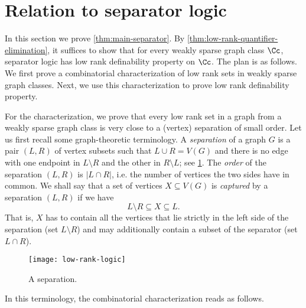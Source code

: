 \section{Relation to separator logic}
\label{sec:separator}

In this section we prove \cref{thm:main-separator}. By \cref{thm:low-rank-quantifier-elimination}, it suffices to show that for every weakly sparse graph class $\Cc$, separator logic has low rank definability property on $\Cc$. The plan is as follows. We first prove a combinatorial characterization of low rank sets in weakly sparse graph classes. Next, we use this characterization to prove low rank definability property.

For the characterization, we prove that every low rank set in a graph from a weakly sparse graph class is very close to a (vertex) separation of small order. Let us first recall some graph-theoretic terminology. A {\em{separation}} of a graph $G$ is a pair $(L,R)$ of vertex subsets such that $L\cup R=V(G)$ and there is no edge with one endpoint in $L\setminus R$ and the other in $R\setminus L$; see \cref{fig:sep}. The {\em{order}} of the separation $(L,R)$ is $|L\cap R|$, i.e. the number of vertices the two sides have in common. We shall say that a set of vertices $X\subseteq V(G)$ is {\em{captured}} by a separation $(L,R)$ if we have
\[L\setminus R \subseteq X\subseteq L.\]
That is, $X$ has to contain all the vertices that lie strictly in the left side of the separation (set $L\setminus R$) and may additionally contain a subset of the separator (set $L\cap R$).

	\begin{figure}
\centering
		\texttt{[image: low-rank-logic]}
		\caption{A separation.}\label{fig:sep}

	\end{figure}

In this terminology, the combinatorial characterization  reads as follows.

